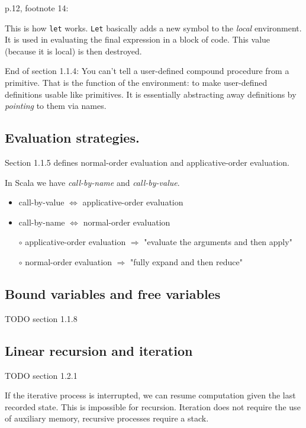 \documentclass{article}
\begin{document}
\noindent
p.12, footnote 14: 

	This is how \texttt{let} works. \texttt{Let} basically adds a new symbol
	to the \textit{local} environment. It is used in evaluating the
	final expression in a block of code. This value	
	(because it is local) is then destroyed.

\noindent
End of section 1.1.4:
	You can't tell a user-defined compound procedure from a primitive.
	That is the function of the environment: to make user-defined 
	definitions usable like primitives. It is essentially
	abstracting away definitions by \textit{pointing} to them via names.

\subsection*{Evaluation strategies.}

Section 1.1.5 defines normal-order evaluation and applicative-order evaluation.

\noindent
In Scala we have \textit{call-by-name} and \textit{call-by-value}.

\begin{itemize}
    \item call-by-value $\Longleftrightarrow$ applicative-order evaluation
    \item call-by-name $\Longleftrightarrow$ normal-order evaluation
\end{itemize}

\begin{itemize}
    \item[$\circ$] applicative-order evaluation $\Rightarrow$ "evaluate the arguments and then apply"
    \item[$\circ$] normal-order evaluation $\Rightarrow$ "fully expand and then reduce"
\end{itemize}

\subsection*{Bound variables and free variables}
TODO section 1.1.8

\subsection*{Linear recursion and iteration}

TODO section 1.2.1

If the iterative process is interrupted, we can resume computation given the last recorded state. This is impossible for recursion. Iteration does not require the use of auxiliary memory, recursive processes require a stack.
\end{document}
